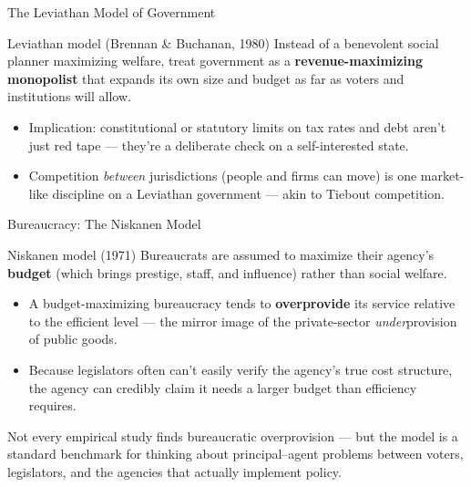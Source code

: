 \documentclass[11pt,aspectratio=169]{beamer}
\begin{document}
\begin{frame}{The Leviathan Model of Government}
  \begin{block}{Leviathan model (Brennan \& Buchanan, 1980)}
    Instead of a benevolent social planner maximizing welfare, treat government as a \textbf{revenue-maximizing monopolist} that expands its own size and budget as far as voters and institutions will allow.
  \end{block}
  \begin{itemize}
    \item Implication: constitutional or statutory limits on tax rates and debt aren't just red tape --- they're a deliberate check on a self-interested state.
    \item Competition \emph{between} jurisdictions (people and firms can move) is one market-like discipline on a Leviathan government --- akin to Tiebout competition.
  \end{itemize}
\end{frame}

\begin{frame}{Bureaucracy: The Niskanen Model}
  \begin{block}{Niskanen model (1971)}
    Bureaucrats are assumed to maximize their agency's \textbf{budget} (which brings prestige, staff, and influence) rather than social welfare.
  \end{block}
  \begin{itemize}
    \item A budget-maximizing bureaucracy tends to \textbf{overprovide} its service relative to the efficient level --- the mirror image of the private-sector \emph{under}provision of public goods.
    \item Because legislators often can't easily verify the agency's true cost structure, the agency can credibly claim it needs a larger budget than efficiency requires.
  \end{itemize}
  \small Not every empirical study finds bureaucratic overprovision --- but the model is a standard benchmark for thinking about principal--agent problems between voters, legislators, and the agencies that actually implement policy.
\end{frame}
\end{document}
